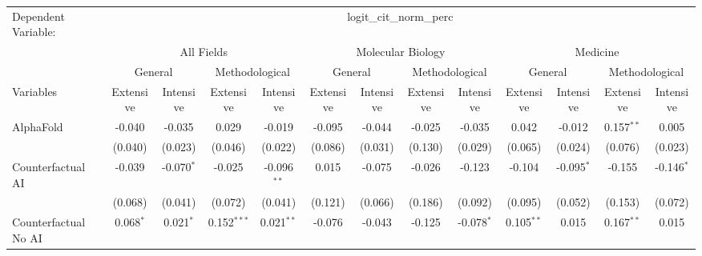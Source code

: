 \begingroup
\centering
\begin{tabular}{lcccccccccccc}
   \tabularnewline \midrule \midrule
   Dependent Variable: & \multicolumn{12}{c}{logit\_cit\_norm\_perc}\\
 & \multicolumn{4}{c}{All Fields} & \multicolumn{4}{c}{Molecular Biology} & \multicolumn{4}{c}{Medicine} \\
\cmidrule(lr){2-5} \cmidrule(lr){6-9} \cmidrule(lr){10-13}
 & \multicolumn{2}{c}{General} & \multicolumn{2}{c}{Methodological} & \multicolumn{2}{c}{General} & \multicolumn{2}{c}{Methodological} & \multicolumn{2}{c}{General} & \multicolumn{2}{c}{Methodological} \\
\cmidrule(lr){2-3} \cmidrule(lr){4-5} \cmidrule(lr){6-7} \cmidrule(lr){8-9} \cmidrule(lr){10-11} \cmidrule(lr){12-13}
Variables & \multicolumn{1}{c}{Extensive} & \multicolumn{1}{c}{Intensive} & \multicolumn{1}{c}{Extensive} & \multicolumn{1}{c}{Intensive} & \multicolumn{1}{c}{Extensive} & \multicolumn{1}{c}{Intensive} & \multicolumn{1}{c}{Extensive} & \multicolumn{1}{c}{Intensive} & \multicolumn{1}{c}{Extensive} & \multicolumn{1}{c}{Intensive} & \multicolumn{1}{c}{Extensive} & \multicolumn{1}{c}{Intensive} \\
\cmidrule(lr){1-1}\cmidrule(lr){2-2} \cmidrule(lr){3-3} \cmidrule(lr){4-4} \cmidrule(lr){5-5} \cmidrule(lr){6-6} \cmidrule(lr){7-7} \cmidrule(lr){8-8} \cmidrule(lr){9-9} \cmidrule(lr){10-10} \cmidrule(lr){11-11} \cmidrule(lr){12-12} \cmidrule(lr){13-13}
   AlphaFold                                & -0.040         & -0.035       & 0.029         & -0.019        & -0.095        & -0.044  & -0.025  & -0.035       & 0.042         & -0.012        & 0.157$^{**}$ & 0.005\\   
                                            & (0.040)        & (0.023)      & (0.046)       & (0.022)       & (0.086)       & (0.031) & (0.130) & (0.029)      & (0.065)       & (0.024)       & (0.076)      & (0.023)\\   
   Counterfactual AI                        & -0.039         & -0.070$^{*}$ & -0.025        & -0.096$^{**}$ & 0.015         & -0.075  & -0.026  & -0.123       & -0.104        & -0.095$^{*}$  & -0.155       & -0.146$^{*}$\\   
                                            & (0.068)        & (0.041)      & (0.072)       & (0.041)       & (0.121)       & (0.066) & (0.186) & (0.092)      & (0.095)       & (0.052)       & (0.153)      & (0.072)\\   
   Counterfactual No AI                     & 0.068$^{*}$    & 0.021$^{*}$  & 0.152$^{***}$ & 0.021$^{**}$  & -0.076        & -0.043  & -0.125  & -0.078$^{*}$ & 0.105$^{**}$  & 0.015         & 0.167$^{**}$ & 0.015\\   

\end{tabular}

